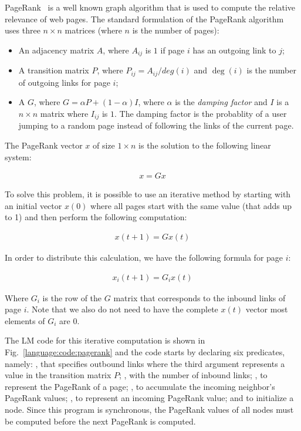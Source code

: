 PageRank~\cite{Page:2001:MNR} is a well known graph algorithm that is used to
compute the relative relevance of web pages. The standard formulation of the
PageRank algorithm uses three $n \times n$ matrices (where $n$ is the number of
pages):

\begin{itemize}

   \item An adjacency matrix $A$, where $A_{ij}$ is $1$ if page $i$ has an
      outgoing link to $j$;

   \item A transition matrix $P$, where $P_{ij} = A_{ij}/deg(i)$ and $\deg(i)$
      is the number of outgoing links for page $i$;

   \item A  $G$, where $G = \alpha P + (1-\alpha)I$, where
      $\alpha$ is the \emph{damping factor} and $I$ is a $n \times n$ matrix
      where $I_{ij}$ is $1$. The damping factor is the probablity of a user
      jumping to a random page instead of following the links of the current
      page.

\end{itemize}

The PageRank vector $x$ of size $1 \times n$ is the solution to the following
linear system:

\begin{align}
x = G x
\end{align}

To solve this problem, it is possible to use an iterative method by starting
with an initial vector $x(0)$ where all pages start with the same value (that
adds up to 1) and then perform the following computation:

\begin{align}
x(t + 1) = G x(t)
\end{align}

In order to distribute this calculation, we have the following formula for page
$i$:

\begin{align}
x_{i}(t + 1) = G_{i} x(t)\label{eq:language:pagerank}
\end{align}

Where $G_{i}$ is the row of the $G$ matrix that corresponds to the inbound links
of page $i$. Note that we also do not need to have the complete $x(t)$ vector
most elements of $G_{i}$ are $0$.

The LM code for this iterative computation is shown in
Fig.~\ref{language:code:pagerank} and the code starts by declaring six
predicates, namely: , that specifies outbound links where the
third argument represents a value in the transition matrix $P$;
, with the number of inbound links; , to
represent the PageRank of a page; , to accumulate the incoming
neighbor's PageRank values; , to represent an incoming
PageRank value; and  to initialize a node.  Since this program is
synchronous, the PageRank values of all nodes must be computed before the next
PageRank is computed.

